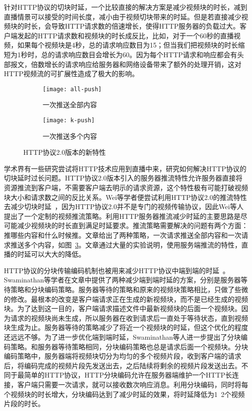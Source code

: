 针对HTTP协议的切块时延，一个比较直接的解决方案是减少视频块的时长，减到直播情景可以接受的时间长度，减小由于视频切块带来的时延。但是若直接减少视频块的时长，会导致HTTP请求数的倍速增长，使得HTTP服务器的负载过大。客户端发起的HTTP请求数和视频块的时长成反比，比如，对于一个60秒的直播视频，如果每个视频块是4秒，总的请求响应数目为15；但当我们把视频块的时长缩短为1秒时，总的请求响应数目会增长为60。因为每个HTTP请求和响应都会有头部报文，倍数增长的请求响应给服务器和网络设备带来了额外的处理开销，这对HTTP视频流的可扩展性造成了极大的影响。

\begin{figure}[htb]
  \centering%
  \begin{subfigure}{0.45\textwidth}
    \texttt{[image: all-push]}
    \caption{一次推送全部内容}
    \label{fig:all_push}
  \end{subfigure}%
  \hfill
  \begin{subfigure}{0.45\textwidth}
    \texttt{[image: k-push]}
    \caption{一次推送多个内容}
    \label{fig:k_push}
  \end{subfigure}
  \caption{HTTP协议2.0版本的新特性~\cite{wei2014low}}
  \label{fig:push}
\end{figure}

学术界有一些研究尝试将HTTP技术应用到直播中来，研究如何解决HTTP协议的切块延时过长问题。HTTP协议2.0版本引入的服务器推流特性允许服务器直接将资源推流到客户端，不需要客户端去明示的请求资源，这个特性极有可能打破视频块大小和请求数之间的反比关系。Wei等学者便尝试利用HTTP协议2.0的推流特性去减少切块时延~\cite{wei2014low}，因为HTTP协议2.0并不是专门的视频传输协议，因此Wei等人提出了一个定制的视频推流策略。利用HTTP服务器推流减少时延的主要思路是尽可能减少视频块的时长直到满足时延要求。推流策略需要解决的问题有两个方面：推哪些内容和什么时候推。文章给出了两种策略，一次请求推送全部内容和一次请求推送多个内容，如图~\ref{fig:push}。文章通过大量的实验说明，使用服务端推流的特性，直播的时延可以大大的降低。

HTTP协议的分块传输编码机制也被用来减少HTTP协议中端到端的时延~\cite{swaminathan2011low}。Swaminathan等学者在文章中提供了两种减少端到端时延的方案，分别是服务器等待策略和分块编码策略。服务器等待的策略和原来的视频块策略相比，只做了些微的修改。最根本的改变是客户端请求正在生成的新视频块，而不是已经生成的视频块。为了达到这一目的，客户端请求描述文件中最新视频块的后面一个视频块。因为请求的视频块尚未生成，所以服务器在收到请求后一直处于等待状态，直到视频块生成为止。服务器等待的策略减少了将近一个视频块的时延，但这个优化的程度还远远不够。为了进一步优化端到端时延，Swaminathan等人进一步提出了分块编码策略。和服务器等待策略相同，分块编码策略也总是请求后面一个视频块。分块编码策略中，服务器端将视频块切分为均匀的多个视频片段，收到客户端的请求后，将编码完成的视频片段先发送出去，之后陆续将剩余的视频片段发送出去。不同于最简单的HTTP协议，HTTP分块编码允许在服务器端维护一个HTTP长连接，客户端只需要一次请求，就可以接收数次响应消息。利用分块编码，同时将每个视频块的时长增大，分块编码达到了减少时延的效果，将时延降低为1~2个视频片段的时长。

